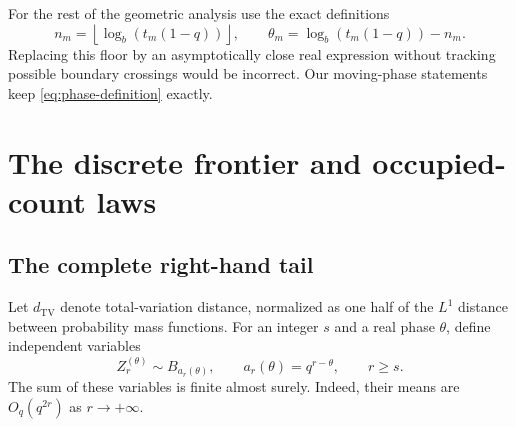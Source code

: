 \documentclass[11pt,a4paper]{article}
\numberwithin{equation}{section}
\theoremstyle{definition}
\theoremstyle{remark}
\newcommand{\TV}{d_{\mathrm{TV}}}
\begin{document}
For the rest of the geometric analysis use the exact definitions
\begin{equation}
n_m=\left\lfloor\log_b(t_m(1-q))\right\rfloor,
\qquad
\theta_m=\log_b(t_m(1-q))-n_m.
\label{eq:phase-definition}
\end{equation}
Replacing this floor by an asymptotically close real expression without
tracking possible boundary crossings would be incorrect. Our moving-phase
statements keep \cref{eq:phase-definition} exactly.

\section{The discrete frontier and occupied-count laws}
\label{sec:frontier}

\subsection{The complete right-hand tail}
Let $\TV$ denote total-variation distance, normalized as one half of the
$L^1$ distance between probability mass functions. For an integer $s$ and
a real phase $\theta$, define independent variables
\begin{equation}
Z_r^{(\theta)}\sim B_{a_r(\theta)},\qquad
a_r(\theta)=q^{r-\theta},\qquad r\ge s.
\label{eq:frontier-law}
\end{equation}
The sum of these variables is finite almost surely. Indeed, their means
are $O_q(q^{2r})$ as $r\to+\infty$.
\end{document}
